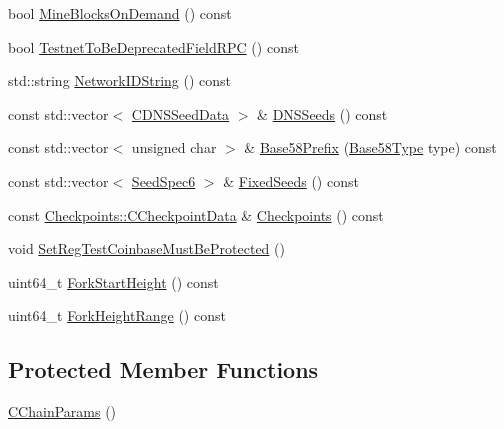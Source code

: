 \begin{DoxyCompactItemize}
bool \mbox{\hyperlink{class_c_chain_params_a96be31ff3d8525c9d5458b7d07ada6bb}{Mine\+Blocks\+On\+Demand}} () const
\item 
bool \mbox{\hyperlink{class_c_chain_params_a1552cea0636112ef84069cd6b7858b8e}{Testnet\+To\+Be\+Deprecated\+Field\+R\+PC}} () const
\item 
std\+::string \mbox{\hyperlink{class_c_chain_params_a2c02cc73f7fe9369cee9a39a0fd5b710}{Network\+I\+D\+String}} () const
\item 
const std\+::vector$<$ \mbox{\hyperlink{struct_c_d_n_s_seed_data}{C\+D\+N\+S\+Seed\+Data}} $>$ \& \mbox{\hyperlink{class_c_chain_params_a402b8df138b265619217ddf934bbc67a}{D\+N\+S\+Seeds}} () const
\item 
const std\+::vector$<$ unsigned char $>$ \& \mbox{\hyperlink{class_c_chain_params_a103c58eca4a26a71201882b3ed6c4cb4}{Base58\+Prefix}} (\mbox{\hyperlink{class_c_chain_params_aa294058ec2e3586bd8d03d6c39667058}{Base58\+Type}} type) const
\item 
const std\+::vector$<$ \mbox{\hyperlink{struct_seed_spec6}{Seed\+Spec6}} $>$ \& \mbox{\hyperlink{class_c_chain_params_ade5bb2aba047b54a032c356b6a09540e}{Fixed\+Seeds}} () const
\item 
const \mbox{\hyperlink{struct_checkpoints_1_1_c_checkpoint_data}{Checkpoints\+::\+C\+Checkpoint\+Data}} \& \mbox{\hyperlink{class_c_chain_params_a818a37d616330e5246a9be4cf8a40813}{Checkpoints}} () const
\item 
void \mbox{\hyperlink{class_c_chain_params_ad7ff3fccf6a11373cb1ecf7d753483d4}{Set\+Reg\+Test\+Coinbase\+Must\+Be\+Protected}} ()
\item 
uint64\+\_\+t \mbox{\hyperlink{class_c_chain_params_a3512eb1ef7869e7b47f88aaa0ae687b3}{Fork\+Start\+Height}} () const
\item 
uint64\+\_\+t \mbox{\hyperlink{class_c_chain_params_a77d1bf8012359cf91159b67906cbadea}{Fork\+Height\+Range}} () const
\end{DoxyCompactItemize}
\subsection*{Protected Member Functions}
\begin{DoxyCompactItemize}
\item 
\mbox{\hyperlink{class_c_chain_params_a8d07fce73d4160244459c5aaae8fb966}{C\+Chain\+Params}} ()
\end{DoxyCompactItemize}
